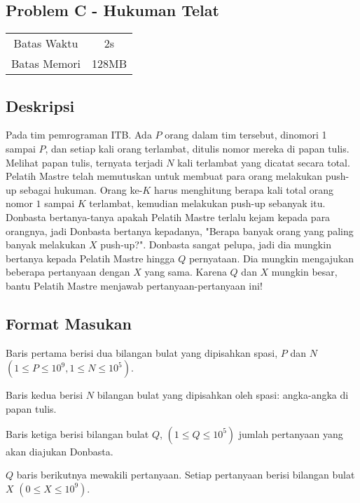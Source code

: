 \documentclass{article}
\begin{document}
\begin{center}
    \section*{Problem C - Hukuman Telat} %
    \begin{tabular}{ | c c | }
        \hline
        Batas Waktu  & 2s \\    %
        Batas Memori & 128MB \\  %
        \hline
    \end{tabular}
\end{center}

\subsection*{Deskripsi}

Pada tim pemrograman ITB. Ada $P$ orang dalam tim tersebut, dinomori 1 sampai $P$, dan setiap kali orang terlambat, ditulis nomor mereka di papan tulis. Melihat papan tulis, ternyata terjadi $N$ kali terlambat yang dicatat secara total. Pelatih Mastre telah memutuskan untuk membuat para orang melakukan push-up sebagai hukuman. Orang ke-$K$ harus menghitung berapa kali total orang nomor $1$ sampai $K$ terlambat, kemudian melakukan push-up sebanyak itu. Donbasta bertanya-tanya apakah Pelatih Mastre terlalu kejam kepada para orangnya, jadi Donbasta bertanya kepadanya, "Berapa banyak orang yang paling banyak melakukan $X$ push-up?". Donbasta sangat pelupa, jadi dia mungkin bertanya kepada Pelatih Mastre hingga $Q$ pernyataan. Dia mungkin mengajukan beberapa pertanyaan dengan $X$ yang sama. Karena $Q$ dan $X$ mungkin besar, bantu Pelatih Mastre menjawab pertanyaan-pertanyaan ini!

\subsection*{Format Masukan}

Baris pertama berisi dua bilangan bulat yang dipisahkan spasi, $P$ dan $N$ $(1 \leq P \leq 10^9,  1 \leq N \leq 10^5)$.

Baris kedua berisi $N$ bilangan bulat yang dipisahkan oleh spasi: angka-angka di papan tulis.

Baris ketiga berisi bilangan bulat $Q$, $(1 \leq Q \leq 10^5)$ jumlah pertanyaan yang akan diajukan Donbasta.

$Q$ baris berikutnya mewakili pertanyaan. Setiap pertanyaan berisi bilangan bulat $X$  $(0 \leq X \leq 10^9)$.
\end{document}
